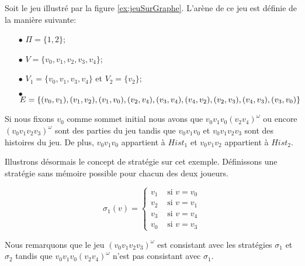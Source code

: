 \begin{exemple}
	Soit le jeu illustré par la figure \ref{ex:jeuSurGraphe}. 
	L'arène de ce jeu est définie de la manière suivante:
	\begin{itemize}
		\item[$\bullet$] $\Pi = \{ 1, 2 \}$;
		\item[$\bullet$] $ V = \{ v_0, v_1, v_2, v_3, v_4 \}$;
		\item[$\bullet$] $V_1 = \{ v_0, v_1, v_3, v_4 \}$ et $V_2 = \{ v_2 \};$
		\item[$\bullet$] $E = \{(v_0, v_1), (v_1, v_2), (v_1, v_0), (v_2, v_4), (v_3, v_4), (v_4, v_2), (v_2, v_3),\\
		 (v_4, v_3),
		 (v_3, v_0) \}$
	\end{itemize} 
	$ $\\
	Si nous fixons $v_0$ comme sommet initial nous avons que $v_0 v_1 v_0 (v_2 v_4)^{\omega}$ ou encore $(v_0 v_1 v_2 v_3)^{\omega}$ sont des parties du jeu tandis que $v_0 v_1 v_0$ et $v_0 v_1 v_2 v_3$ sont des histoires du jeu. De plus, $v_0 v_1 v_0 $ appartient à $Hist_1$ et $v_0 v_1 v_2$ appartient à $Hist_2$.
	
	Illustrons désormais le concept de stratégie sur cet exemple. Définissons une stratégie sans mémoire possible pour chacun des deux joueurs.

	
	 \begin{minipage}[c]{0.4\linewidth}$$ \sigma_1(v) = \begin{cases}
					 v_1  &\text{ si } v = v_0\\
					v_2  &\text{ si } v = v_1\\
					v_3 &\text{ si } v = v_4\\
					v_0 &\text{ si } v = v_3
				\end{cases} $$\end{minipage} \hfill
	\begin{minipage}[c]{0.1\linewidth}\end{minipage} \hfill \begin{minipage}[c]{0.30\linewidth}	 \end{minipage} \newline
	
	Nous remarquons que le jeu $(v_0 v_1 v_2 v_3)^{\omega}$ est consistant avec les stratégies $\sigma_1$ et $\sigma_2$ tandis que $v_0 v_1 v_0 (v_2 v_4)^{\omega}$ n'est pas consistant avec $\sigma_1$.
		
		
	
	\begin{figure}[ht!]
		\centering
\end{figure}
\end{exemple}
